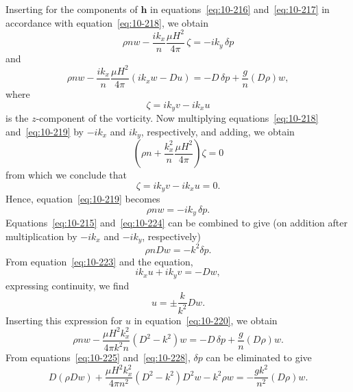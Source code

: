 Inserting for the components of $\mathbf{h}$ in equations~\eqref{eq:10-216} and~\eqref{eq:10-217} in accordance with equation~\eqref{eq:10-218}, we obtain
\begin{equation}
\label{eq:10-219}
\rho nw - \frac{ik_x}{n}\frac{\mu H^2}{4\pi}\,\zeta = -ik_y\,\delta p
\end{equation}
and
\begin{equation}
\label{eq:10-220}
\rho nw - \frac{ik_x}{n}\frac{\mu H^2}{4\pi}(ik_xw-Du) = -D\,\delta p + \frac{g}{n}(D\rho)w,
\end{equation}
where
\begin{equation}
\label{eq:10-221}
\zeta = ik_yv - ik_xu
\end{equation}
is the $z$-component of the vorticity. Now multiplying equations~\eqref{eq:10-218} and~\eqref{eq:10-219} by $-ik_x$ and $ik_y$, respectively, and adding, we obtain
\begin{equation}
\label{eq:10-222}
\left(\rho n+\frac{k_x^2}{n}\frac{\mu H^2}{4\pi}\right)\zeta = 0
\end{equation}
from which we conclude that
\begin{equation}
\label{eq:10-223}
\zeta = ik_yv - ik_xu = 0.
\end{equation}
Hence, equation~\eqref{eq:10-219} becomes
\begin{equation}
\label{eq:10-224}
\rho nw = -ik_y\,\delta p.
\end{equation}
Equations~\eqref{eq:10-215} and~\eqref{eq:10-224} can be combined to give (on addition after multiplication by $-ik_x$ and $-ik_y$, respectively)
\begin{equation}
\label{eq:10-225}
\rho nDw = -k^2\delta p.
\end{equation}
From equation~\eqref{eq:10-223} and the equation,
\begin{equation}
\label{eq:10-226}
ik_xu+ik_yv = -Dw,
\end{equation}
expressing continuity, we find
\begin{equation}
\label{eq:10-227}
u = \pm\frac{k}{k^2}Dw.
\end{equation}
Inserting this expression for $u$ in equation~\eqref{eq:10-220}, we obtain
\begin{equation}
\label{eq:10-228}
\rho nw - \frac{\mu H^2 k_x^2}{4\pi k^2 n}(D^2-k^2)w = -D\,\delta p + \frac{g}{n}(D\rho)w.
\end{equation}
From equations~\eqref{eq:10-225} and~\eqref{eq:10-228}, $\delta p$ can be eliminated to give
\begin{equation}
\label{eq:10-229}
D(\rho Dw) + \frac{\mu H^2 k_x^2}{4\pi n^2}(D^2-k^2)D^2w - k^2\rho w = -\frac{gk^2}{n^2}(D\rho)w.
\end{equation}


